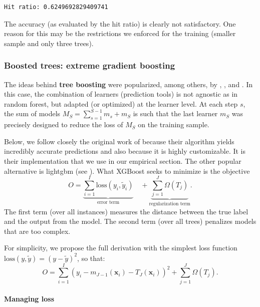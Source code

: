 \begin{verbatim}
Hit ratio: 0.6249692829409741
\end{verbatim}

The accuracy (as evaluated by the hit ratio) is clearly not satisfactory. One reason for this may be the restrictions we enforced for the training (smaller sample and only three trees).

\subsubsection{Boosted trees: extreme gradient boosting}

The ideas behind \textbf{tree boosting} were popularized, among others, by \cite{mason2000boosting}, \cite{friedman2001greedy}, and \cite{friedman2002stochastic}. In this case, the combination of learners (prediction tools) is not agnostic as in random forest, but adapted (or optimized) at the learner level. At each step $s$, the sum of models $M_S=\sum_{s=1}^{S -1}m_s+m_S$ is such that the last learner $m_S$ was precisely designed to reduce the loss of $M_S$ on the training sample.

Below, we follow closely the original work of \cite{chen2016xgboost} because their algorithm yields incredibly accurate predictions and also because it is highly customizable. It is their implementation that we use in our empirical section. The other popular alternative is lightgbm (see \cite{ke2017lightgbm}). What XGBoost seeks to minimize is the objective
\begin{equation}
O=\underbrace{\sum_{i=1}^I \text{loss}(y_i,\tilde{y}_i)}_{\text{error term}} \quad + \underbrace{\sum_{j=1}^J\Omega(T_j)}_{\text{regularization term}}.
\end{equation}
The first term (over all instances) measures the distance between the true label and the output from the model. The second term (over all trees) penalizes models that are too complex.

For simplicity, we propose the full derivation with the simplest loss function $\text{loss}(y,\tilde{y})=(y -\tilde{y})^2$, so that:
\begin{equation}
O=\sum_{i=1}^I \left(y_i-m_{J-1}(\mathbf{x}_i)-T_J(\mathbf{x}_i)\right)^2+ \sum_{j=1}^J\Omega(T_j).
\end{equation}

\paragraph{Managing loss}

